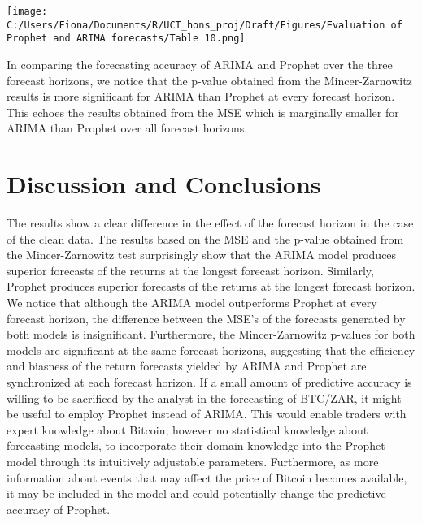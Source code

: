 \documentclass[12pt,a4paper]{article}
\numberwithin{equation}{section}
\numberwithin{figure}{section}
\numberwithin{table}{section}
\let\origfigure\figure
\let\endorigfigure\endfigure
\renewenvironment{figure}[1][2] {
    \expandafter\origfigure\expandafter[H]
} {
    \endorigfigure
}
\begin{document}
\begin{figure}[htbp]
\centering
\texttt{[image: C:/Users/Fiona/Documents/R/UCT\_hons\_proj/Draft/Figures/Evaluation of Prophet and ARIMA forecasts/Table 10.png]}
\caption{MSE for all forecast horizons}
\end{figure}

In comparing the forecasting accuracy of ARIMA and Prophet over the
three forecast horizons, we notice that the p-value obtained from the
Mincer-Zarnowitz results is more significant for ARIMA than Prophet at
every forecast horizon. This echoes the results obtained from the MSE
which is marginally smaller for ARIMA than Prophet over all forecast
horizons.

\section{\texorpdfstring{Discussion and Conclusions
\label{Discussion and Conclusions}}{Discussion and Conclusions }}\label{discussion-and-conclusions}

The results show a clear difference in the effect of the forecast
horizon in the case of the clean data. The results based on the MSE and
the p-value obtained from the Mincer-Zarnowitz test surprisingly show
that the ARIMA model produces superior forecasts of the returns at the
longest forecast horizon. Similarly, Prophet produces superior forecasts
of the returns at the longest forecast horizon. We notice that although
the ARIMA model outperforms Prophet at every forecast horizon, the
difference between the MSE's of the forecasts generated by both models
is insignificant. Furthermore, the Mincer-Zarnowitz p-values for both
models are significant at the same forecast horizons, suggesting that
the efficiency and biasness of the return forecasts yielded by ARIMA and
Prophet are synchronized at each forecast horizon. If a small amount of
predictive accuracy is willing to be sacrificed by the analyst in the
forecasting of BTC/ZAR, it might be useful to employ Prophet instead of
ARIMA. This would enable traders with expert knowledge about Bitcoin,
however no statistical knowledge about forecasting models, to
incorporate their domain knowledge into the Prophet model through its
intuitively adjustable parameters. Furthermore, as more information
about events that may affect the price of Bitcoin becomes available, it
may be included in the model and could potentially change the predictive
accuracy of Prophet.
\end{document}
